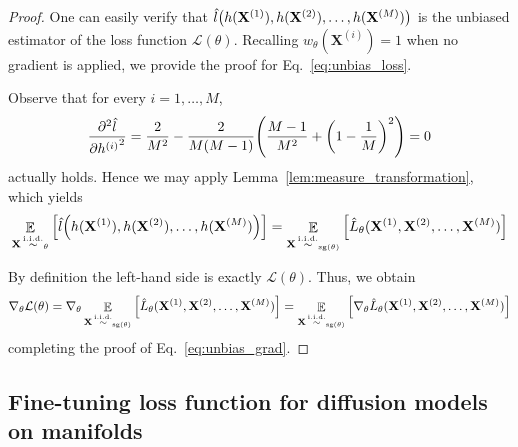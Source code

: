 \documentclass{article}
\theoremstyle{plain}
\theoremstyle{definition}
\theoremstyle{remark}
\let\P\relax
\DeclareMathOperator{\P}{\mathbb{P}}
\DeclareMathOperator{\E}{\mathbb{E}}
\DeclareMathOperator{\sg}{\mathrm{sg}}
\DeclareMathOperator{\iid}{\overset{\mathrm{i.i.d.}}{\sim}}
\begin{document}
\begin{proof}
    One can easily verify that $\hat{l}\qty(h(\mathbf{X}^{(1)}), h(\mathbf{X}^{(2)}), \dots, h(\mathbf{X}^{(M)}))$ is the unbiased estimator of the loss function $\mathcal{L}(\theta)$. Recalling $w_\theta(\mathbf{X}^{(i)}) = 1$ when no gradient is applied, we provide the proof for Eq.~\eqref{eq:unbias_loss}.

    Observe that for every $i=1,\dots,M$,
    \begin{equation}
        \pdv[2]{\hat{l}}{{h^{(i)}}} = \frac{2}{M^2} - \frac{2}{M(M-1)} \qty(\frac{M-1}{M^2} + \qty(1-\frac{1}{M})^2) = 0
    \end{equation}
    actually holds. Hence we may apply Lemma~\ref{lem:measure_transformation}, which yields
    \begin{equation}
        \E_{\mathbf{X} \iid \P_\theta} \qty[\hat{l}\qty(h(\mathbf{X}^{(1)}), h(\mathbf{X}^{(2)}), \dots, h(\mathbf{X}^{(M)}))]
        =\E_{\mathbf{X} \iid \P_{\sg(\theta)}} \qty[\hat{L}_\theta(\mathbf{X}^{(1)}, \mathbf{X}^{(2)}, \dots, \mathbf{X}^{(M)})]
    \end{equation}

    By definition the left-hand side is exactly
    $\mathcal{L}(\theta)$. Thus, we obtain
    \begin{equation}
            \nabla_\theta\mathcal{L}(\theta)=\nabla_\theta\E_{\mathbf{X} \iid \P_{\sg(\theta)}} \qty[\hat{L}_\theta(\mathbf{X}^{(1)}, \mathbf{X}^{(2)}, \dots, \mathbf{X}^{(M)})] = \E_{\mathbf{X} \iid \P_{\sg(\theta)}} \qty[\nabla_\theta\hat{L}_\theta(\mathbf{X}^{(1)}, \mathbf{X}^{(2)}, \dots, \mathbf{X}^{(M)})]
    \end{equation}
    completing the proof of Eq.~\eqref{eq:unbias_grad}.
\end{proof}

\subsection{Fine-tuning loss function for diffusion models on manifolds}
\end{document}
